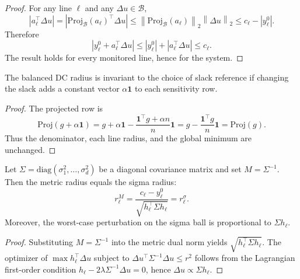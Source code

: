 \documentclass[energies,article,submit,pdftex,moreauthors]{Definitions/mdpi}
\newcommand{\ones}{\mathbf{1}}
\newcommand{\norm}[1]{\left\lVert #1 \right\rVert}
\newcommand{\abs}[1]{\left\lvert #1 \right\rvert}
\newcommand{\Proj}{\mathrm{Proj}}
\begin{document}
\begin{proof}
For any line $\ell$ and any $\Delta u\in\mathcal{B}$,
\begin{equation}
  \abs{a_\ell^\top\Delta u}
  =
  \abs{\Proj_{\mathcal{B}}(a_\ell)^\top\Delta u}
  \le
  \norm{\Proj_{\mathcal{B}}(a_\ell)}_2\norm{\Delta u}_2
  \le
  c_\ell-\abs{y_\ell^0}.
\end{equation}
Therefore
\begin{equation}
  \abs{y_\ell^0+a_\ell^\top\Delta u}
  \le
  \abs{y_\ell^0}+\abs{a_\ell^\top\Delta u}
  \le c_\ell.
\end{equation}
The result holds for every monitored line, hence for the system.
\end{proof}

\begin{Proposition}
\label{prop:slack}
The balanced DC radius is invariant to the choice of slack reference if changing the slack adds a constant vector $\alpha\ones$ to each sensitivity row.
\end{Proposition}

\begin{proof}
The projected row is
\begin{equation}
  \Proj(g+\alpha\ones)
  =
  g+\alpha\ones
  -
  \frac{\ones^\top g + \alpha n}{n}\ones
  =
  g-\frac{\ones^\top g}{n}\ones
  =
  \Proj(g).
\end{equation}
Thus the denominator, each line radius, and the global minimum are unchanged.
\end{proof}

\begin{Proposition}
\label{prop:sigma}
Let $\Sigma=\mathrm{diag}(\sigma_1^2,\ldots,\sigma_d^2)$ be a diagonal covariance matrix and set $M=\Sigma^{-1}$. Then the metric radius equals the sigma radius:
\begin{equation}
  r_\ell^M
  =
  \frac{c_\ell-y_\ell^0}{\sqrt{h_\ell^\top\Sigma h_\ell}}
  =
  r_\ell^\sigma.
\end{equation}
Moreover, the worst-case perturbation on the sigma ball is proportional to $\Sigma h_\ell$.
\end{Proposition}

\begin{proof}
Substituting $M=\Sigma^{-1}$ into the metric dual norm yields
$\sqrt{h_\ell^\top\Sigma h_\ell}$. The optimizer of
$\max h_\ell^\top\Delta u$ subject to
$\Delta u^\top\Sigma^{-1}\Delta u\le r^2$ follows from the Lagrangian first-order condition
$h_\ell-2\lambda\Sigma^{-1}\Delta u=0$, hence
$\Delta u\propto \Sigma h_\ell$.
\end{proof}
\end{document}
